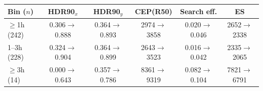 \begin{tabular}{lccccc}
\toprule
Bin ($n$) & HDR90$_x$ & HDR90$_y$ & CEP(R50) & Search eff. & ES \\
\midrule
$\ge$1h (242) & 0.306$\to$0.888 & 0.364$\to$0.893 & 2974$\to$3858 & 0.020$\to$0.046 & 2652$\to$2338 \\
1--3h (228) & 0.324$\to$0.904 & 0.364$\to$0.899 & 2643$\to$3523 & 0.016$\to$0.042 & 2335$\to$2065 \\
$\ge$3h (14) & 0.000$\to$0.643 & 0.357$\to$0.786 & 8361$\to$9319 & 0.082$\to$0.104 & 7821$\to$6791 \\
\bottomrule
\end{tabular}